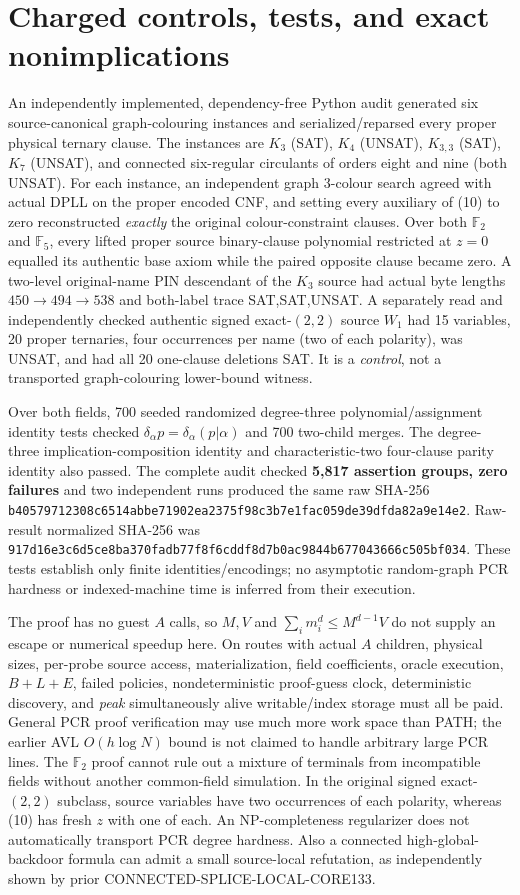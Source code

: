 \documentclass[11pt]{article}
\begin{document}
\section{Charged controls, tests, and exact nonimplications}
An independently implemented, dependency-free Python audit generated six source-canonical graph-colouring instances and serialized/reparsed every proper physical ternary clause. The instances are $K_3$ (SAT), $K_4$ (UNSAT), $K_{3,3}$ (SAT), $K_7$ (UNSAT), and connected six-regular circulants of orders eight and nine (both UNSAT). For each instance, an independent graph 3-colour search agreed with actual DPLL on the proper encoded CNF, and setting every auxiliary of (10) to zero reconstructed \emph{exactly} the original colour-constraint clauses. Over both $\mathbb F_2$ and $\mathbb F_5$, every lifted proper source binary-clause polynomial restricted at $z=0$ equalled its authentic base axiom while the paired opposite clause became zero. A two-level original-name PIN descendant of the $K_3$ source had actual byte lengths $450\to494\to538$ and both-label trace SAT,SAT,UNSAT. A separately read and independently checked authentic signed exact-$(2,2)$ source $W_1$ had 15 variables, 20 proper ternaries, four occurrences per name (two of each polarity), was UNSAT, and had all 20 one-clause deletions SAT. It is a \emph{control}, not a transported graph-colouring lower-bound witness.

Over both fields, 700 seeded randomized degree-three polynomial/assignment identity tests checked $\delta_\alpha p=\delta_\alpha(p|\alpha)$ and 700 two-child merges. The degree-three implication-composition identity and characteristic-two four-clause parity identity also passed. The complete audit checked \textbf{5,817 assertion groups, zero failures} and two independent runs produced the same raw SHA-256 \texttt{b40579712308c6514abbe71902ea2375f98c3b7e1fac059de39dfda82a9e14e2}. Raw-result normalized SHA-256 was \texttt{917d16e3c6d5ce8ba370fadb77f8f6cddf8d7b0ac9844b677043666c505bf034}. These tests establish only finite identities/encodings; no asymptotic random-graph PCR hardness or indexed-machine time is inferred from their execution.

The proof has no guest $A$ calls, so $M,V$ and $\sum_i m_i^d\le M^{d-1}V$ do not supply an escape or numerical speedup here. On routes with actual $A$ children, physical sizes, per-probe source access, materialization, field coefficients, oracle execution, $B+L+E$, failed policies, nondeterministic proof-guess clock, deterministic discovery, and \emph{peak} simultaneously alive writable/index storage must all be paid. General PCR proof verification may use much more work space than PATH; the earlier AVL $O(h\log N)$ bound is not claimed to handle arbitrary large PCR lines. The $\mathbb F_2$ proof cannot rule out a mixture of terminals from incompatible fields without another common-field simulation. In the original signed exact-$(2,2)$ subclass, source variables have two occurrences of each polarity, whereas (10) has fresh $z$ with one of each. An NP-completeness regularizer does not automatically transport PCR degree hardness. Also a connected high-global-backdoor formula can admit a small source-local refutation, as independently shown by prior CONNECTED-SPLICE-LOCAL-CORE133.
\end{document}
